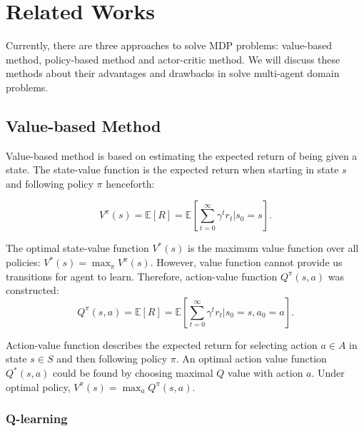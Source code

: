 \documentclass[11pt,twocolumn]{jarticle} %
\begin{document}
\section{Related Works}

Currently, there are three approaches to solve MDP problems: value-based method, policy-based method and actor-critic method. We will discuss these methods about their advantages and drawbacks in solve multi-agent domain problems.

\subsection{Value-based Method}

Value-based method is based on estimating the expected return of being given a state. The state-value function is the expected return when starting in state $s$ and following policy $\pi$ henceforth: 

\begin{equation}
V^\pi(s) = \mathbb{E}[R] = \mathbb{E}[\sum_{t=0}^{\infty}\gamma^t r_t | s_0 = s].
\end{equation}

The optimal state-value function $V^*(s)$ is the maximum value function over all policies:
$ V^*(s) = \max_\pi V^\pi(s) $.
However, value function cannot provide us transitions for agent to learn. Therefore, action-value function $Q^\pi(s, a)$ was constructed:
\begin{equation}
Q^\pi(s, a) = \mathbb{E}[R] = \mathbb{E}[\sum_{t=0}^{\infty}\gamma^t r_t | s_0 = s, a_0 = a]. 
\end{equation}

Action-value function describes the expected return for selecting action $a \in A$ in state $s \in S$ and then following policy $\pi$. An optimal action value function $Q^*(s, a)$ could be found by choosing maximal $Q$ value with action $a$. Under optimal policy, $V^\pi(s) = \max_a{Q^\pi(s, a)}$.

\subsubsection{Q-learning\cite{qlearning}}
\end{document}
